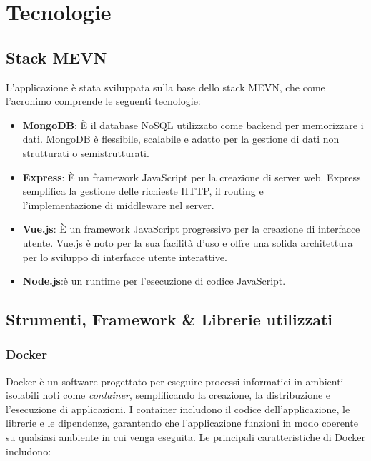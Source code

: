 \chapter{Tecnologie}

%
%
%
\section{Stack MEVN}

L’applicazione è stata sviluppata sulla base dello stack MEVN, che come l’acronimo comprende le seguenti tecnologie:

\begin{itemize}
    \item \textbf{MongoDB}: È il database NoSQL utilizzato come backend per memorizzare i dati. MongoDB è flessibile, scalabile e adatto per la gestione di dati non strutturati o semistrutturati.

    \item \textbf{Express}: È un framework JavaScript per la creazione di server web. Express semplifica la gestione delle richieste HTTP, il routing e \\l'implementazione di middleware nel server.

    \item \textbf{Vue.js}: È un framework JavaScript progressivo per la creazione di interfacce utente. Vue.js è noto per la sua facilità d'uso e offre una solida architettura per lo sviluppo di interfacce utente interattive.

    \item \textbf{Node.js}:è un runtime per l'esecuzione di codice JavaScript.
\end{itemize}

%
%
%
\section{Strumenti, Framework \& Librerie utilizzati}

%
%
%
\subsection{Docker}

Docker è un software progettato per eseguire processi informatici in ambienti isolabili noti come \emph{container}, semplificando la creazione, la distribuzione e l'esecuzione di applicazioni.
%
I container includono il codice dell'applicazione, le librerie e le dipendenze, garantendo che l'applicazione funzioni in modo coerente su qualsiasi ambiente in cui venga eseguita.
%
Le principali caratteristiche di Docker includono:

